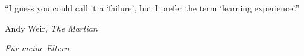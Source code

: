 
\thispagestyle{empty}
\vspace*{0.2\textheight}
\noindent\enquote{I guess you could call it a \enquote{failure}, but I prefer the term \enquote{learning
experience}.}\bigbreak

\hfill Andy Weir, \textit{The Martian}

\vfill{}
\begin{flushright}
\emph{Für meine Eltern.}
\end{flushright}
\cleardoublepage
